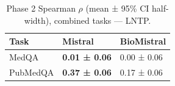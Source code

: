 \begin{table}
\caption{Phase 2 Spearman $\rho$ (mean ± 95\% CI half-width), combined tasks — LNTP.}
\label{tab:phase2_spearman_all_lntp}
\begin{tabular}{lll}
\toprule
Task & Mistral & BioMistral \\
\midrule
MedQA & \textbf{0.01 ± 0.06} & 0.00 ± 0.06 \\
PubMedQA & \textbf{0.37 ± 0.06} & 0.17 ± 0.06 \\
\bottomrule
\end{tabular}
\end{table}
